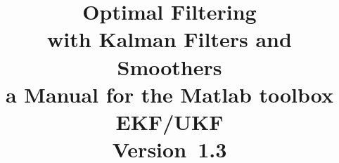 \newcommand{\vectheta}[0]{\boldsymbol{\theta}}
\newcommand{\vecalpha}[0]{\boldsymbol{\alpha}}
\newcommand{\vecbeta}[0]{\boldsymbol{\beta}}
\newcommand{\veceta}[0]{\boldsymbol{\eta}}
\newcommand{\vecmu}[0]{\boldsymbol{\mu}}
\newcommand{\vecsigma}[0]{\boldsymbol{\sigma}}

\DeclareMathOperator{\tr}{tr}
\DeclareMathOperator{\diag}{diag}
\DeclareMathOperator{\chol}{chol}
\DeclareMathOperator{\dchol}{dchol}
\DeclareMathOperator{\Cov}{Cov}
\DeclareMathOperator{\Var}{Var}
\DeclareMathOperator{\E}{E}
\DeclareMathOperator{\N}{N}
\DeclareMathOperator{\gammad}{Gamma}
\DeclareMathOperator{\expd}{Exp}
\DeclareMathOperator{\sech}{sech}
\DeclareMathOperator{\dt}{\Delta t}
\DeclareMathOperator{\dtk}{\Delta t_k}


\newcommand{\balpha}[0]{\boldsymbol{\alpha}}
\newcommand{\bbeta}[0]{\boldsymbol{\beta}}
\newcommand{\btheta}[0]{\boldsymbol{\theta}}
\newcommand{\bphi}[0]{\boldsymbol{\phi}}
\newcommand{\bmu}[0]{\boldsymbol{\mu}}
\newcommand{\bSigma}[0]{\boldsymbol{\Sigma}}
\newcommand{\blambda}[0]{\boldsymbol{\lambda}}
\newcommand{\brho}[0]{\boldsymbol{\rho}}
\newcommand{\bGamma}[0]{\boldsymbol{\Gamma}}



%
%

\newenvironment{boxlist1}{
  \begin{list}{}{\leftmargin=2pt}}{ %
  \end{list}}
\newenvironment{boxlist2}{
  \begin{list}{-}{\itemsep=-1pt,\topsep=0pt,\setlength{\leftmargin}{8pt}}}{
  \end{list}}

\title{{\Huge Optimal Filtering \\with Kalman Filters and Smoothers} \\
  a Manual for the Matlab toolbox EKF/UKF \\
  {\normalsize Version~1.3}}

